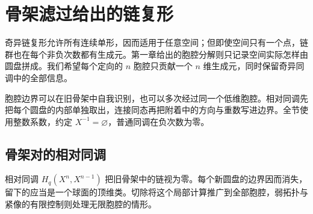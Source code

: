 
% 
% 

\section{骨架滤过给出的链复形}
\label{g2:sec:0301}

奇异链复形允许所有连续单形，因而适用于任意空间；但即使空间只有一个点，链群也在每个非负次数都有生成元。第一章给出的胞腔分解则只记录空间实际怎样由圆盘拼成。我们希望每个定向的 \(n\) 胞腔只贡献一个 \(n\) 维生成元，同时保留奇异同调中的全部信息。

\ProseParagraphBreak

胞腔边界可以在旧骨架中自我识别，也可以多次经过同一个低维胞腔。相对同调先把每个圆盘的内部单独取出，连接同态再把附着中的方向与重数写进边界。全节使用整数系数，约定 \(X^{-1}=\varnothing\)，普通同调在负次数为零。

\subsection{骨架对的相对同调}
\label{g2:subsec:0301:01}
相对同调 \(H_q(X^n,X^{n-1})\) 把旧骨架中的链视为零。每个新圆盘的边界因而消失，留下的应当是一个球面的顶维类。切除将这个局部计算推广到全部胞腔，弱拓扑与紧像的有限控制则处理无限胞腔的情形。

